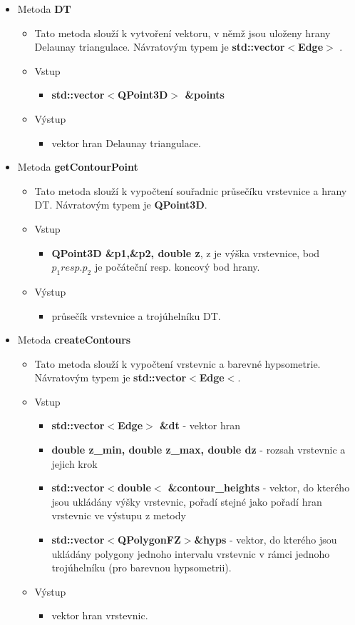 \documentclass[a4paper, 12pt]{article}
\begin{document}
\begin{itemize}
	\item Metoda \textbf{DT}		
\begin{itemize}
	\item Tato metoda slouží k vytvoření vektoru, v němž jsou uloženy hrany Delaunay triangulace. Návratovým typem je \textbf{std::vector$<$Edge$>$ }.
	\item Vstup
	\begin{itemize}
		\item \textbf{std::vector$<$QPoint3D$>$ \&points} 
	\end{itemize}
	\item Výstup
	\begin{itemize}	
		\item vektor hran Delaunay triangulace.
	\end{itemize}
\end{itemize}

	\item Metoda \textbf{getContourPoint}		
\begin{itemize}
	\item Tato metoda slouží k vypočtení souřadnic průsečíku vrstevnice a hrany DT. Návratovým typem je \textbf{QPoint3D}.
	\item Vstup
	\begin{itemize}
		\item \textbf{QPoint3D \&p1,\&p2, double z}, z je výška vrstevnice, bod $p_1 resp. p_2$ je počáteční resp. koncový bod hrany.
	\end{itemize}
	\item Výstup
	\begin{itemize}	
		\item průsečík vrstevnice a trojúhelníku DT.
	\end{itemize}
\end{itemize}

	\item Metoda \textbf{createContours}		
\begin{itemize}
	\item Tato metoda slouží k vypočtení vrstevnic a barevné hypsometrie. Návratovým typem je \textbf{std::vector$<$Edge$<$}.
	\item Vstup
	\begin{itemize}
		\item \textbf{std::vector$<$Edge$>$ \&dt} - vektor hran
		\item \textbf{double z\_min, double z\_max, double dz} - rozsah vrstevnic a jejich krok
		\item \textbf{std::vector$<$double$<$ \&contour\_heights} - vektor, do kterého jsou ukládány výšky vrstevnic, pořadí stejné jako pořadí hran vrstevnic ve výstupu z metody
		\item \textbf{std::vector$<$QPolygonFZ$>$\&hyps} - vektor, do kterého jsou ukládány polygony jednoho intervalu vrstevnic v rámci jednoho trojúhelníku (pro barevnou hypsometrii). 
	\end{itemize}
	\item Výstup
	\begin{itemize}	
		\item vektor hran vrstevnic.
	\end{itemize}
\end{itemize}


\end{itemize}
\end{document}
